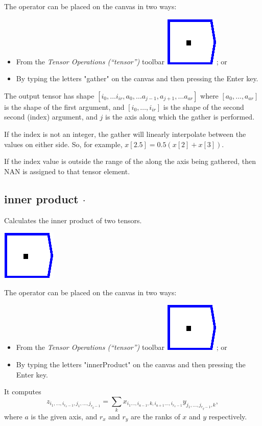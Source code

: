 The operator can be placed on the canvas in two ways:
\begin{itemize}
\item From the \emph{Tensor Operations (``tensor'')} toolbar \includegraphics{images/innerProduct};
or 
\item By typing the letters "gather" on the canvas and then pressing the
Enter key.
\end{itemize}
The output tensor has shape $[i_{0},\ldots i_{ir},a_{0},\ldots a_{j-1},a_{j+1},\ldots a_{ar}]$
where $[a_{0},\ldots,a_{ar}]$ is the shape of the first argument,
and $[i_{0},\ldots,i_{ir}]$ is the shape of the second second (index)
argument, and $j$ is the axis along which the gather is performed.

If the index is not an integer, the gather will linearly interpolate
between the values on either side. So, for example, $x[2.5]=0.5(x[2]+x[3])$.

If the index value is outside the range of the 
along the axis being gathered, then NAN is assigned to that tensor
element.

\subsection{inner product $\cdot$}

\label{Operation:innerProduct} Calculates the inner product of two
tensors.

\includegraphics{images/innerProduct}

The operator can be placed on the canvas in two ways:
\begin{itemize}
\item From the \emph{Tensor Operations (``tensor'')} toolbar \includegraphics{images/innerProduct};
or 
\item By typing the letters "innerProduct" on the canvas and then pressing
the Enter key.
\end{itemize}
It computes 
\[
z_{i_{1},\ldots,i_{r_{x}-1},j_{1},\ldots,j_{r_{y}-1}}=\sum_{k}x_{i_{1}\ldots,i_{a-1},k,i_{a+1}\ldots,i_{r_{x}-1}}y_{j_{1},\ldots,j_{r_{y}-1},k},
\]
where $a$ is the given axis, and $r_{x}$ and $r_{y}$ are the ranks
of $x$ and $y$ respectively.

